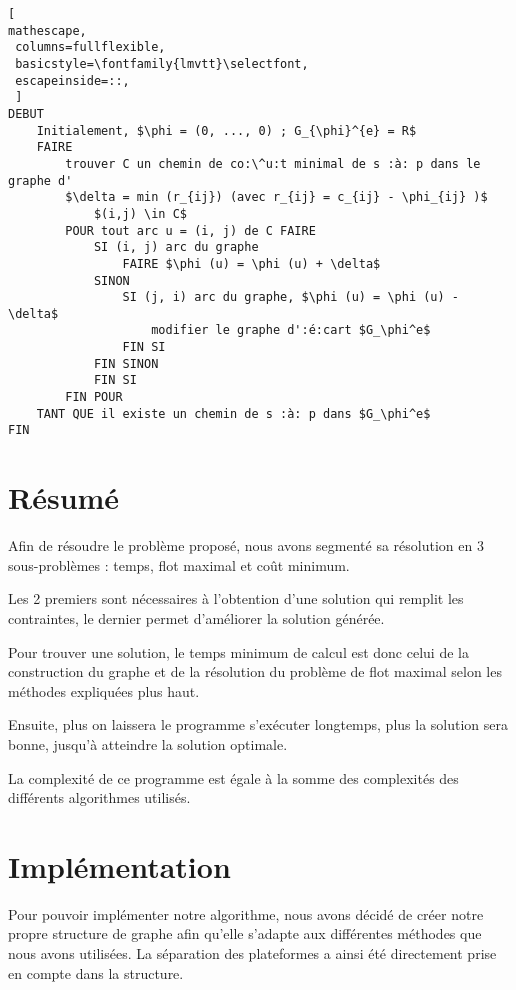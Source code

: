 \documentclass[a4paper,12pt]{article}
\begin{document}
\begin{lstlisting}[
mathescape,
 columns=fullflexible,
 basicstyle=\fontfamily{lmvtt}\selectfont,
 escapeinside=::,
 ]
DEBUT
    Initialement, $\phi = (0, ..., 0) ; G_{\phi}^{e} = R$
    FAIRE
        trouver C un chemin de co:\^u:t minimal de s :à: p dans le graphe d'
        $\delta = min (r_{ij}) (avec r_{ij} = c_{ij} - \phi_{ij} )$
            $(i,j) \in C$
        POUR tout arc u = (i, j) de C FAIRE
            SI (i, j) arc du graphe
                FAIRE $\phi (u) = \phi (u) + \delta$
            SINON
                SI (j, i) arc du graphe, $\phi (u) = \phi (u) - \delta$
                    modifier le graphe d':é:cart $G_\phi^e$
                FIN SI
            FIN SINON
            FIN SI
        FIN POUR
    TANT QUE il existe un chemin de s :à: p dans $G_\phi^e$
FIN
\end{lstlisting}

\section{Résumé}

Afin de résoudre le problème proposé, nous avons segmenté sa résolution en 3 sous-problèmes : temps, flot  maximal et coût minimum. 

Les 2 premiers sont nécessaires à l'obtention d'une solution qui remplit les contraintes, le dernier permet d'améliorer la solution générée. 

Pour trouver une solution, le temps minimum de calcul est donc celui de la construction du graphe et de la résolution du problème de flot maximal selon les méthodes expliquées plus haut. 

Ensuite, plus on laissera le programme s'exécuter longtemps, plus la solution sera bonne, jusqu'à atteindre la solution optimale.

La complexité de ce programme est égale à la somme des complexités des différents algorithmes utilisés.

\section{Implémentation}

Pour pouvoir impl\'ementer notre algorithme, nous avons d\'ecid\'e de cr\'eer notre propre structure de graphe afin qu'elle s'adapte aux diff\'erentes m\'ethodes que nous avons utilisées. La s\'eparation des plateformes a ainsi \'et\'e directement prise en compte dans la structure.
\end{document}
